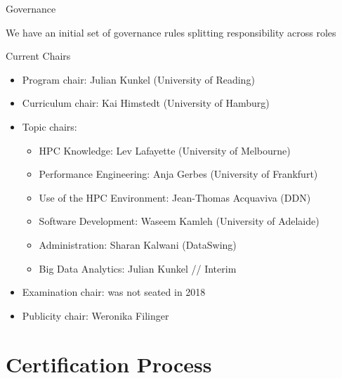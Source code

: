 \documentclass[compress,aspectratio=169]{beamer}
\begin{document}
\begin{frame}{Governance}

	\smallskip
  We have an initial set of governance rules splitting responsibility across roles

  \begin{block}{Current Chairs}
  \vspace*{-0.5em}
  \begin{itemize}
    \item Program chair: Julian Kunkel (University of Reading)
    \item Curriculum chair: Kai Himstedt (University of Hamburg)
    \item  Topic chairs:
    \begin{itemize}
      \item HPC Knowledge: Lev Lafayette (University of Melbourne)
      \item Performance Engineering: Anja Gerbes (University of Frankfurt)
      \item Use of the HPC Environment: Jean-Thomas Acquaviva (DDN)
      \item Software Development: Waseem Kamleh (University of Adelaide)
			\item Administration: Sharan Kalwani (DataSwing)
			\item Big Data Analytics: Julian Kunkel // Interim
    \end{itemize}
    \item Examination chair: was not seated in 2018
    \item Publicity chair: Weronika Filinger
  \end{itemize}
  \end{block}
\end{frame}

\section{Certification Process}
\sectionIntroHidden
\end{document}

